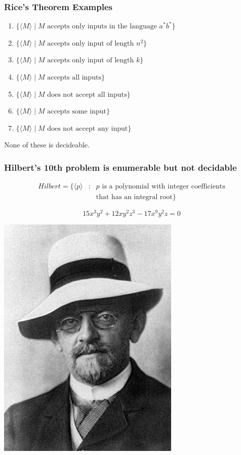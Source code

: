 \documentclass{beamer}
\newcommand{\bfr}[1]{\begin{frame}[fragile]\frametitle{{ #1 }}}
\begin{document}
\bfr{Rice's Theorem Examples}
\begin{enumerate}
  \item $\{\langle M\rangle\mid \mbox{$M$ accepts only inputs in the language $a^*b^*$}\}$
\item  $\{\langle M\rangle\mid \mbox{$M$ accepts only input of length $n^2$}\}$
\item  $\{\langle M\rangle\mid \mbox{$M$ accepts only input of length $k$}\}$
\item $\{\langle  M\rangle\mid \mbox{$M$ accepts all inputs}\}$
\item $\{\langle  M\rangle\mid \mbox{$M$ does not accept all inputs}\}$
\item $\{\langle  M\rangle\mid \mbox{$M$ accepts some input}\}$
\item $\{\langle  M\rangle\mid \mbox{$M$ does not accept any input}\}$
\end{enumerate}

None of these is decideable.

\end{frame}

\bfr{Hilbert's 10th problem is enumerable but not decidable}
\begin{eqnarray*}
Hilbert = \{\langle p \rangle &:& \mbox{$p$ is a polynomial with integer
  coefficients}\\ &&\mbox{that has an integral root}\}
\end{eqnarray*}

\vfill

\[
15x^3y^2 + 12xy^2z^3 - 17x^9y^2z = 0
\]
\vfill

\hfill\includegraphics[scale=0.25]{Hilbert.jpg}
\end{frame}
\end{document}
